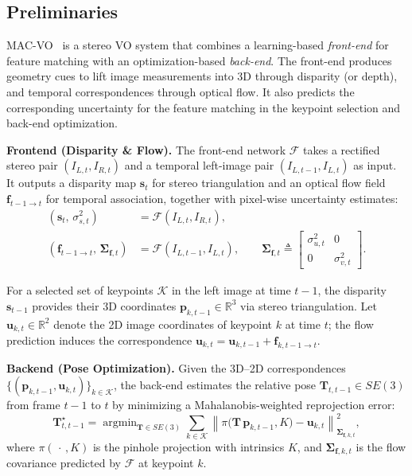 \subsection{Preliminaries}
\label{sec:preliminaries}

\noindent MAC-VO~\cite{qiu2025mac} is a stereo VO system that combines a learning-based \emph{front-end} for feature matching with an optimization-based \emph{back-end}.
The front-end produces geometry cues to lift image measurements into 3D through disparity (or depth), and temporal correspondences through optical flow.
It also predicts the corresponding uncertainty for the feature matching in the keypoint selection and back-end optimization.

\noindent\textbf{Frontend (Disparity \& Flow).}
The front-end network $\mathcal{F}$ takes a rectified stereo pair $(I_{L,t}, I_{R,t})$ and a temporal left-image pair $(I_{L,t-1}, I_{L,t})$ as input.
It outputs a disparity map $\mathbf{s}_t$ for stereo triangulation and an optical flow field $\mathbf{f}_{t-1\rightarrow t}$ for temporal association, together with pixel-wise uncertainty estimates:
\begin{equation}
\label{eq:frontend_outputs}
\begin{aligned}
(\mathbf{s}_t,\, \sigma_{s,t}^2) &= \mathcal{F}(I_{L,t}, I_{R,t}), \\
(\mathbf{f}_{t-1\rightarrow t},\, \boldsymbol{\Sigma}_{\mathbf{f},t}) &= \mathcal{F}(I_{L,t-1}, I_{L,t}), \qquad
\boldsymbol{\Sigma}_{\mathbf{f},t} \triangleq
\begin{bmatrix}
\sigma_{u,t}^2 & 0\\
0 & \sigma_{v,t}^2
\end{bmatrix}.
\end{aligned}
\end{equation}

For a selected set of keypoints $\mathcal{K}$ in the left image at time $t-1$, the disparity $\mathbf{s}_{t-1}$ provides their 3D coordinates $\mathbf{p}_{k,t-1}\in\mathbb{R}^3$ via stereo triangulation.
Let $\mathbf{u}_{k,t}\in\mathbb{R}^2$ denote the 2D image coordinates of keypoint $k$ at time $t$; the flow prediction induces the correspondence
$\mathbf{u}_{k,t} = \mathbf{u}_{k,t-1} + \mathbf{f}_{k,t-1\rightarrow t}$.

\noindent\textbf{Backend (Pose Optimization).}
Given the 3D--2D correspondences $\{(\mathbf{p}_{k,t-1}, \mathbf{u}_{k,t})\}_{k\in\mathcal{K}}$, the back-end estimates the relative pose $\mathbf{T}_{t,t-1}\in SE(3)$ from frame $t\!-1$ to $t$ by minimizing a Mahalanobis-weighted reprojection error:
\begin{equation}
\label{eq:backend_pose_opt}
\mathbf{T}^\star_{t,t-1}
= \mathop{\arg\min}_{\mathbf{T}\in SE(3)}
\sum_{k\in\mathcal{K}}
\left\|\pi\bigl(\mathbf{T}\,\mathbf{p}_{k,t-1}, K\bigr) - \mathbf{u}_{k,t}\right\|^2_{\boldsymbol{\Sigma}_{\mathbf{f},k,t}},
\end{equation}
where $\pi(\,\cdot\,,K)$ is the pinhole projection with intrinsics $K$, and $\boldsymbol{\Sigma}_{\mathbf{f},k,t}$ is the  flow covariance predicted by $\mathcal F$ at keypoint $k$.

